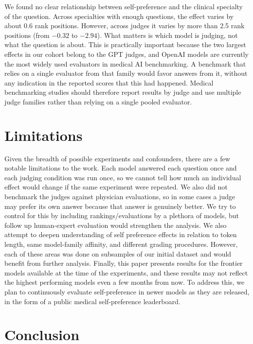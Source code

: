 \documentclass[11pt]{article}
\begin{document}
We found no clear relationship between self-preference and the clinical specialty of the question. Across specialties with enough questions, the effect varies by about 0.6 rank positions. However, across judges it varies by more than 2.5 rank positions (from $-0.32$ to $-2.94$). What matters is which model is judging, not what the question is about. This is practically important because the two largest effects in our cohort belong to the GPT judges, and OpenAI models are currently the most widely used evaluators in medical AI benchmarking. A benchmark that relies on a single evaluator from that family would favor answers from it, without any indication in the reported scores that this had happened. Medical benchmarking studies should therefore report results by judge and use multiple judge families rather than relying on a single pooled evaluator.


\section{Limitations}


Given the breadth of possible experiments and confounders, there are a few notable limitations to the work. Each model answered each question once and each judging condition was run once, so we cannot tell how much an individual effect would change if the same experiment were repeated. We also did not benchmark the judges against physician evaluations, so in some cases a judge may prefer its own answer because that answer is genuinely better. We try to control for this by including rankings/evaluations by a plethora of models, but follow up human-expert evaluation would strengthen the analysis. We also attempt to deepen understanding of self preference effects in relation to token length, same model-family affinity, and different grading procedures. However, each of these areas was done on subsamples of our initial dataset and would benefit from further analysis. Finally, this paper presents results for the frontier models available at the time of the experiments, and these results may not reflect the highest performing models even a few months from now. To address this, we plan to continuously evaluate self-preference in newer models as they are released, in the form of a public medical self-preference leaderboard.

\section{Conclusion}
\end{document}
